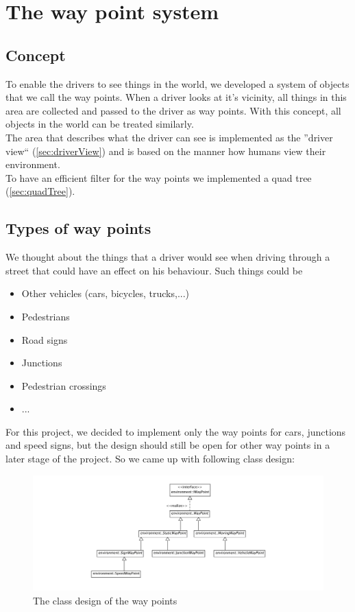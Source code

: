 \section{The way point system}
\label{sec:wayPointSystem}

\subsection{Concept}

To enable the drivers to see things in the world, we developed a system of 
objects that we call the way points. When a driver looks at it's vicinity, all
things in this area are collected and passed to the driver as way points. With
this concept, all objects in the world can be treated similarly.\\

\noindent The area that describes what the driver can see is implemented as the 
''driver view`` (\ref{sec:driverView}) and is based on the manner 
how humans view their environment. \\

\noindent To have an efficient filter for the way points we implemented a quad tree 
(\ref{sec:quadTree}).

\subsection{Types of way points}

We thought about the things that a driver would see when driving through a 
street that could have an effect on his behaviour. Such things could be

\begin{itemize}
\item Other vehicles (cars, bicycles, trucks,...)
\item Pedestrians
\item Road signs
\item Junctions
\item Pedestrian crossings
\item ...
\end{itemize}

For this project, we decided to implement only the way points for 
cars, junctions and speed signs, but the design should still be open for 
other way points in a later stage of the project. So we came up with following
class design:

\begin{figure}[htb]
\includegraphics[width=\textwidth]{images/waypoints.png}
\caption{The class design of the way points}
\label{fig:waypoints}
\end{figure}

